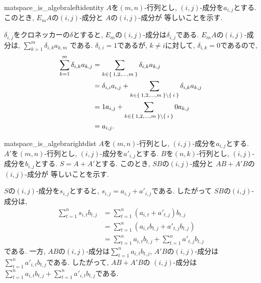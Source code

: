 \begin{proofof*}{matspace_is_algebra}{leftidentity}
  $A$を$(m,n)$-行列とし, $(i,j)$-成分を$a_{i,j}$とする.
  このとき,
  $E_mA$の$(i,j)$-成分と
  $A$の$(i,j)$-成分が
  等しいことを示す.

  $\delta_{i,j}$をクロネッカーの$\delta$とすると,
  $E_m$の$(i,j)$-成分は$\delta_{i,j}$である.
  $E_mA$の$(i,j)$-成分は,
  $\sum_{k=1}^{m}\delta_{i,k}a_{k,m}$
  である.
  $\delta_{i,i}=1$であるが,
  $k\neq i$に対して, $\delta_{i,k}=0$であるので,
  \begin{align*}
    \sum_{k=1}^{m}\delta_{i,k}a_{k,j}
    &=\sum_{k\in \Set{1,2,\ldots,m}}\delta_{i,k}a_{k,j}\\
    &=\delta_{i,i}a_{i,j} + \sum_{k\in \Set{1,2,\ldots,m}\setminus\Set{i}}\delta_{i,k}a_{k,j}\\
    &=1a_{i,j} + \sum_{k\in \Set{1,2,\ldots,m}\setminus\Set{i}}0a_{k,j}\\
    &=a_{i,j}.
  \end{align*}
\end{proofof*}

\begin{proofof*}{matspace_is_algebra}{rightdist}
  $A$を$(m,n)$-行列とし, $(i,j)$-成分を$a_{i,j}$とする.
  $A'$を$(m,n)$-行列とし, $(i,j)$-成分を$a'_{i,j}$とする.
  $B$を$(n,k)$-行列とし, $(i,j)$-成分を$b_{i,j}$とする.
  $S=A+A'$とする.
  このとき,
  $SB$の$(i,j)$-成分と
  $AB+A'B$の$(i,j)$-成分が
  等しいことを示す.

  $S$の$(i,j)$-成分を$s_{i,j}$とすると,
  $s_{i,j}=a_{i,j}+a'_{i,j}$である.
  したがって
  $SB$の$(i,j)$-成分は,
  \begin{align*}
    \sum_{t=1}^{n}s_{i,t}b_{t,j}
    &=\sum_{t=1}^{n}(a_{i,t}+a'_{t,j})b_{t,j}\\
    &=\sum_{t=1}^{n}(a_{i,t}b_{t,j}+a'_{t,j}b_{t,j})\\
    &=\sum_{t=1}^{n}a_{i,t}b_{t,j}+\sum_{t=1}^{n}a'_{t,j}b_{t,j}
  \end{align*}
  である.
  一方,
  $AB$の$(i,j)$-成分は$\sum_{t=1}^{n}a_{i,t}b_{t,j}$,
  $A'B$の$(i,j)$-成分は$\sum_{t=1}^{n}a'_{i,t}b_{t,j}$である.
  したがって, $AB+A'B$の
  $(i,j)$-成分は$\sum_{t=1}^{n}a_{i,t}b_{t,j}+\sum_{t=1}^{n}a'_{i,t}b_{t,j}$である.
\end{proofof*}

